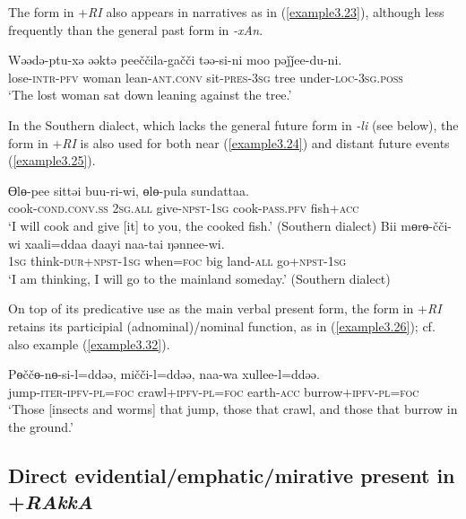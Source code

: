\documentclass[output=paper,colorlinks,citecolor=brown]{langscibook}
\begin{document}
The form in +\textit{RI} also appears in narratives as in (\ref{example3.23}), although less frequently than the general past form in \textit{-xAn}.

\ea
\label{example3.23}
\gll Wəədə-ptu-xə		əəktə	peeččila-gačči	təə-si-ni		moo		pəǰǰee-du-ni.\\
     	lose-\textsc{intr}-\textsc{pfv}	woman	lean-\textsc{ant}.\textsc{conv}	sit-\textsc{pres}-\textsc{3sg}	tree		under-\textsc{loc}-\textsc{3sg}.\textsc{poss}\\
\glt `The lost woman sat down leaning against the tree.’
\z

In the Southern dialect, which lacks the general future form in \textit{-li} (see  below), the form in +\textit{RI} is also used for both near (\ref{example3.24}) and distant future events (\ref{example3.25}).
	
\ea
\label{example3.24}
\gll Ɵlɵ-pee				sittəi	buu-ri-wi,		ɵlɵ-pula			sundattaa.\\
     	cook-\textsc{cond}.\textsc{conv}.\textsc{ss}	\textsc{2sg}.\textsc{all}	give-\textsc{npst}-\textsc{1sg}	cook-\textsc{pass}.\textsc{pfv}	fish+\textsc{acc}\\
\glt `I will cook and give [it] to you, the cooked fish.’ (Southern dialect)
\ex
\label{example3.25}
\gll Bii	mɵrɵ-čči-wi		xaali=ddaa	daayi	naa-tai		ŋənnee-wi.\\
     	\textsc{1sg}	think-\textsc{dur+npst}-\textsc{1sg}	when=\textsc{foc}	big		land-\textsc{all}		go+\textsc{npst}-\textsc{1sg}\\
\glt `I am thinking, I will go to the mainland someday.’ (Southern dialect)
\z

On top of its predicative use as the main verbal present form, the form in +\textit{RI} retains its participial (adnominal)/nominal function, as in (\ref{example3.26}); cf. also example (\ref{example3.32}).

\ea
\label{example3.26}
\gll Pɵččɵ-nɵ-si-l=ddəə,		mičči-l=ddəə,			naa-wa 		xullee-l=ddəə.\\
     	jump-\textsc{iter}-\textsc{ipfv}-\textsc{pl}=\textsc{foc}	crawl+\textsc{ipfv}-\textsc{pl}=\textsc{foc}	earth-\textsc{acc}	burrow+\textsc{ipfv}-\textsc{pl}=\textsc{foc}\\
\glt `Those [insects and worms] that jump, those that crawl, and those that burrow in the ground.’
\z


\subsection{Direct evidential/emphatic/mirative present in +\textit{RAkkA}}\label{Section3.4.2}
\end{document}
